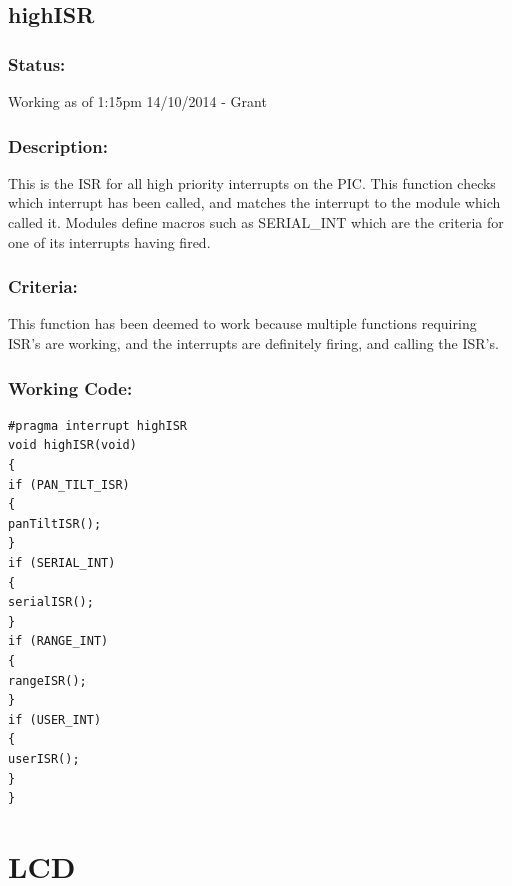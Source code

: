 \documentclass[]{report}
\begin{document}
\subsection{highISR}
\subsubsection{Status:}
Working as of 1:15pm 14/10/2014 - Grant

\subsubsection{Description:}
This is the ISR for all high priority interrupts on the PIC. This function checks which interrupt has been called, and matches the interrupt to the module which called it. Modules define macros such as SERIAL\_INT which are the criteria for one of its interrupts having fired.

\subsubsection{Criteria:}
This function has been deemed to work because multiple functions requiring ISR's are working, and the interrupts are definitely firing, and calling the ISR's.

\subsubsection{Working Code:}
\begin{lstlisting}
#pragma interrupt highISR
void highISR(void)
{
if (PAN_TILT_ISR)
{
panTiltISR();
}
if (SERIAL_INT)
{
serialISR();
}
if (RANGE_INT)
{
rangeISR();
}
if (USER_INT)
{
userISR();
}
}
\end{lstlisting}


\newpage
\section{LCD}
\end{document}

